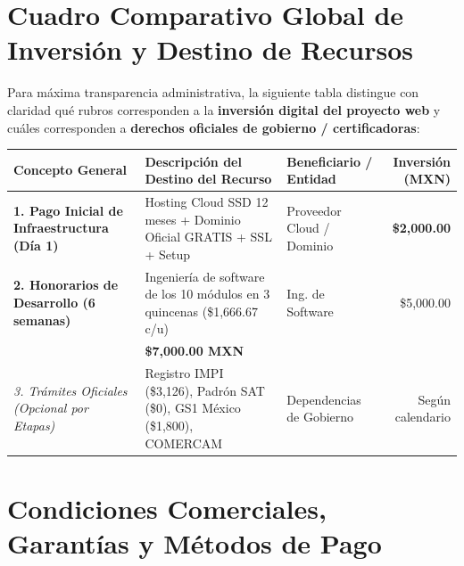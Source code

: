 \documentclass[11pt,letterpaper]{article}
\begin{document}
\section{Cuadro Comparativo Global de Inversión y Destino de Recursos}

Para máxima transparencia administrativa, la siguiente tabla distingue con claridad qué rubros corresponden a la \textbf{inversión digital del proyecto web} y cuáles corresponden a \textbf{derechos oficiales de gobierno / certificadoras}:

\vspace{0.15cm}

\noindent
\footnotesize
\begin{tabularx}{\textwidth}{p{4.2cm} X p{2.8cm} r}
\toprule
\rowcolor{MezcalAgave!15}
Concepto General & Descripción del Destino del Recurso & Beneficiario / Entidad & Inversión (MXN) \\
\midrule
\textbf{1. Pago Inicial de Infraestructura (Día 1)} & Hosting Cloud SSD 12 meses + Dominio Oficial GRATIS + SSL + Setup & Proveedor Cloud / Dominio & \textbf{\$2,000.00} \\
\textbf{2. Honorarios de Desarrollo (6 semanas)} & Ingeniería de software de los 10 módulos en 3 quincenas (\$1,666.67 c/u) & Ing. de Software & \$5,000.00 \\
\midrule
\rowcolor{MezcalGold!20}
\multicolumn{3}{l}{\textbf{TOTAL DE LA PLATAFORMA WEB INTEGRAL (LLAVE EN MANO):}} & \textbf{\$7,000.00 MXN} \\
\midrule
\textit{3. Trámites Oficiales (Opcional por Etapas)} & Registro IMPI (\$3,126), Padrón SAT (\$0), GS1 México (\$1,800), COMERCAM & Dependencias de Gobierno & Según calendario \\
\bottomrule
\end{tabularx}

\vspace{0.3cm}

\section{Condiciones Comerciales, Garantías y Métodos de Pago}
\end{document}
